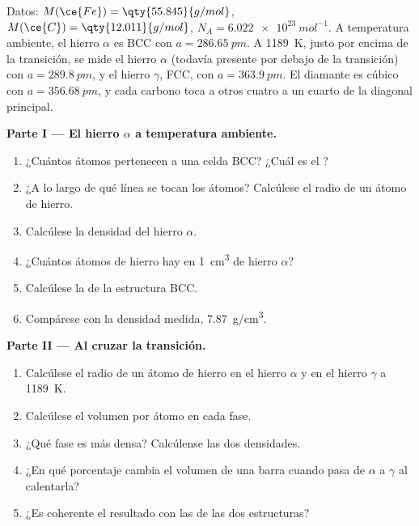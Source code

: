 \begin{problem}
\label{pb:b1:crystals-metals:1}
Datos: $M(\ce{Fe}) = \qty{55.845}{g/mol}$, $M(\ce{C}) = \qty{12.011}{g/mol}$,
$N_A = \qty{6.022e23}{mol^{-1}}$. A temperatura ambiente, el hierro
$\alpha$ es BCC con $a = \qty{286.65}{pm}$. A \qty{1189}{K}, justo por
encima de la transición, se mide el hierro $\alpha$ (todavía presente por
debajo de la transición) con $a = \qty{289.8}{pm}$, y el hierro $\gamma$,
FCC, con $a = \qty{363.9}{pm}$. El diamante es cúbico con
$a = \qty{356.68}{pm}$, y cada carbono toca a otros cuatro a un cuarto de
la diagonal principal.

\medskip
\noindent\textbf{Parte I --- El hierro $\alpha$ a temperatura ambiente.}
\begin{enumerate}
  \item ¿Cuántos átomos pertenecen a una celda BCC? ¿Cuál es el ?
  \item ¿A lo largo de qué línea se tocan los átomos? Calcúlese el radio
        de un átomo de hierro.
  \item Calcúlese la densidad del hierro $\alpha$.
  \item ¿Cuántos átomos de hierro hay en \qty{1}{cm^3} de hierro
        $\alpha$?
  \item Calcúlese la  de la estructura BCC.
  \item Compárese con la densidad medida, \qty{7.87}{g/cm^3}.
\end{enumerate}

\medskip
\noindent\textbf{Parte II --- Al cruzar la transición.}
\begin{enumerate}[resume]
  \item Calcúlese el radio de un átomo de hierro en el hierro $\alpha$ y
        en el hierro $\gamma$ a \qty{1189}{K}.
  \item Calcúlese el volumen por átomo en cada fase.
  \item ¿Qué fase es más densa? Calcúlense las dos densidades.
  \item ¿En qué porcentaje cambia el volumen de una barra cuando pasa de
        $\alpha$ a $\gamma$ al calentarla?
  \item ¿Es coherente el resultado con las  de las dos
        estructuras?
\end{enumerate}


\end{problem}
